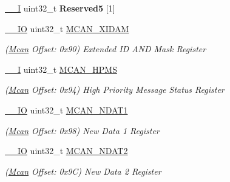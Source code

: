 \begin{DoxyCompactItemize}
\mbox{\label{structMcan_afb277b19cee6585ad666459a1377f78b}} 
\mbox{\hyperlink{core__cm7_8h_af63697ed9952cc71e1225efe205f6cd3}{\+\_\+\+\_\+I}} uint32\+\_\+t {\bfseries Reserved5} \mbox{[}1\mbox{]}
\item 
\mbox{\label{structMcan_a6915c098e1a79a6fccdb873a1b0b17e5}} 
\mbox{\hyperlink{core__cm7_8h_aec43007d9998a0a0e01faede4133d6be}{\+\_\+\+\_\+\+IO}} uint32\+\_\+t \mbox{\hyperlink{structMcan_a6915c098e1a79a6fccdb873a1b0b17e5}{M\+C\+A\+N\+\_\+\+X\+I\+D\+AM}}
\begin{DoxyCompactList}\small\item\em (\mbox{\hyperlink{structMcan}{Mcan}} Offset\+: 0x90) Extended ID A\+ND Mask Register \end{DoxyCompactList}\item 
\mbox{\label{structMcan_aebdedb82eeb264100ba403d8a9d775dc}} 
\mbox{\hyperlink{core__cm7_8h_af63697ed9952cc71e1225efe205f6cd3}{\+\_\+\+\_\+I}} uint32\+\_\+t \mbox{\hyperlink{structMcan_aebdedb82eeb264100ba403d8a9d775dc}{M\+C\+A\+N\+\_\+\+H\+P\+MS}}
\begin{DoxyCompactList}\small\item\em (\mbox{\hyperlink{structMcan}{Mcan}} Offset\+: 0x94) High Priority Message Status Register \end{DoxyCompactList}\item 
\mbox{\label{structMcan_add03a9f5d627e3f201666496c83af93f}} 
\mbox{\hyperlink{core__cm7_8h_aec43007d9998a0a0e01faede4133d6be}{\+\_\+\+\_\+\+IO}} uint32\+\_\+t \mbox{\hyperlink{structMcan_add03a9f5d627e3f201666496c83af93f}{M\+C\+A\+N\+\_\+\+N\+D\+A\+T1}}
\begin{DoxyCompactList}\small\item\em (\mbox{\hyperlink{structMcan}{Mcan}} Offset\+: 0x98) New Data 1 Register \end{DoxyCompactList}\item 
\mbox{\label{structMcan_af6fa81fd7c8ab89e4e6d9d79ac9be018}} 
\mbox{\hyperlink{core__cm7_8h_aec43007d9998a0a0e01faede4133d6be}{\+\_\+\+\_\+\+IO}} uint32\+\_\+t \mbox{\hyperlink{structMcan_af6fa81fd7c8ab89e4e6d9d79ac9be018}{M\+C\+A\+N\+\_\+\+N\+D\+A\+T2}}
\begin{DoxyCompactList}\small\item\em (\mbox{\hyperlink{structMcan}{Mcan}} Offset\+: 0x9C) New Data 2 Register \end{DoxyCompactList}\item 

\end{DoxyCompactItemize}
